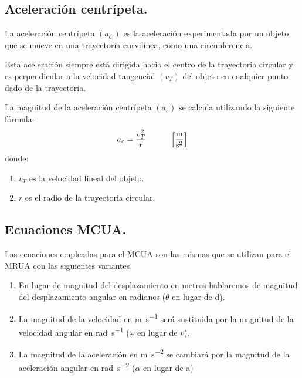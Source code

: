 \documentclass[12pt]{article}
\begin{document}
\subsection{Aceleración centrípeta.}

La aceleración centrípeta $(a_{C})$ es la aceleración experimentada por un objeto que se mueve en una trayectoria curvilínea, como una circunferencia.

Esta aceleración siempre está dirigida hacia el centro de la trayectoria circular  y es perpendicular a la velocidad tangencial $(v_{T})$ del objeto en cualquier punto dado de la trayectoria.
\begin{figure}[H]
    \centering
{}
\end{figure}

La magnitud de la aceleración centrípeta $(a_{c})$ se calcula utilizando la siguiente fórmula:
\begin{align*}
a_{c} = \dfrac{v_{T}^{2}}{r} \hspace{1cm} \left[ \unit[per-mode=fraction]{\meter\per\square\second} \right]
\end{align*}
donde:
\begin{enumerate}[label=\alph*)]
\item $v_{T}$ es la velocidad lineal del objeto.
\item $r$ es el radio de la trayectoria circular.
\end{enumerate}

\subsection{Ecuaciones MCUA.}

Las ecuaciones empleadas para el MCUA son las mismas que se utilizan para el MRUA con las siguientes variantes.

\begin{enumerate}[label=\roman*)]
\item En lugar de magnitud del desplazamiento en metros hablaremos de magnitud del desplazamiento angular en radianes ($\theta$ en lugar de d).
\item La magnitud de la velocidad en \unit{\meter\per\second} será sustituida por la magnitud de la velocidad angular en \unit{\radian\per\second} ($\omega$ en lugar de $v$).
\item La magnitud de la aceleración en \unit{\meter\per\square\second} se cambiará por la magnitud de la aceleración angular en \unit{\radian\per\square\second} ($\alpha$ en lugar de a)
\end{enumerate}
\end{document}
